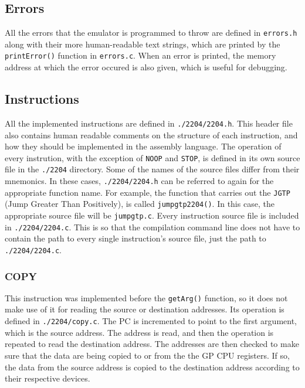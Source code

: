 \documentclass[a4paper,11pt]{article}
\begin{document}
    \subsection{Errors}
        All the errors that the emulator is programmed to throw are defined in \lstinline{errors.h} along with their more human-readable text strings, which are printed by the \lstinline{printError()} function in \lstinline{errors.c}. When an error is printed, the memory address at which the error occured is also given, which is useful for debugging.
    
    \subsection{Instructions}
        All the implemented instructions are defined in \lstinline{./2204/2204.h}. This header file also contains human readable comments on the structure of each instruction, and how they should be implemented in the assembly language. The operation of every instrution, with the exception of \lstinline{NOOP} and \lstinline{STOP}, is defined in its own source file in the \lstinline{./2204} directory. Some of the names of the source files differ from their mnemonics. In these cases, \lstinline{./2204/2204.h} can be referred to again for the appropriate function name. For example, the function that carries out the \lstinline{JGTP} (Jump Greater Than Positively), is called \lstinline{jumpgtp2204()}. In this case, the appropriate source file will be \lstinline{jumpgtp.c}. Every instruction source file is included in \lstinline{./2204/2204.c}. This is so that the compilation command line does not have to contain the path to every single instruction's source file, just the path to \lstinline{./2204/2204.c}.
    
        \subsubsection{COPY}
            This instruction was implemented before the \lstinline{getArg()} function, so it does not make use of it for reading the source or destination addresses. Its operation is defined in \lstinline{./2204/copy.c}. The PC is incremented to point to the first argument, which is the source address. The address is read, and then the operation is repeated to read the destination address. The addresses are then checked to make sure that the data are being copied to or from the the GP CPU registers. If so, the data from the source address is copied to the destination address according to their respective devices.
            
\end{document}
